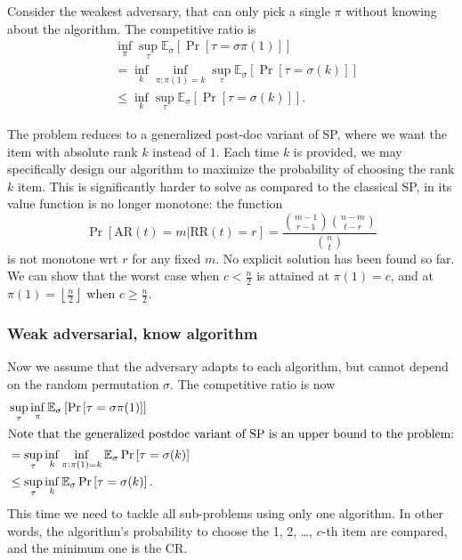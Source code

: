 Consider the weakest adversary, that can only pick a single $\pi$ without knowing about the algorithm. The competitive ratio is
\begin{align*}
	&\inf_\pi \sup_\tau \mathbb{E}_\sigma \left[ \operatorname{Pr}\left[{  \tau = \sigma\pi(1) }\right]   \right]\\
	&= \inf_k \inf_{\pi:\pi(1)=k}\sup_\tau \mathbb{E}_\sigma \left[ \operatorname{Pr}\left[{  \tau = \sigma(k) }\right]   \right]\\
	&\le  \inf_k \sup_\tau \mathbb{E}_\sigma \left[ \operatorname{Pr}\left[{  \tau = \sigma(k) }\right]   \right]
.\end{align*}

The problem reduces to a generalized post-doc variant of SP, where we want the item with absolute rank $k$ instead of $1$. Each time $k $ is provided, we may specifically design our algorithm to maximize the probability of choosing the rank $k $ item. This is significantly harder to solve as compared to the classical SP, in its value function is no longer monotone: the function \[
\operatorname{Pr}\left[{\text{AR}(t) = m | \text{RR}(t) = r }\right] = \frac{\binom{m-1}{r-1}\binom{n-m}{t-r}}{\binom{n}{t}}
\]
is not monotone wrt $r $ for any fixed $m $. No explicit solution has been found so far. We can show that the worst case when $c < \frac{n}{2}$ is attained at $\pi(1)=c $, and at $\pi(1) = \left\lfloor \frac{n}{2} \right\rfloor $ when $ c \ge  \frac{n}{2}$.

\subsubsection{Weak adversarial, know algorithm}

Now we assume that the adversary adapts to each algorithm, but cannot depend on the random permutation $\sigma$. The competitive ratio is now
\begin{align*}
	&\sup_\tau  \inf_\pi \mathbb{E}_\sigma \left[ \operatorname{Pr}\left[{ 
	\tau = \sigma\pi(1) }   \right] \right]\\
\intertext{Note that the generalized postdoc variant of SP is an upper bound to the problem:}
	&= \sup_\tau \inf_k \inf_{\pi:\pi(1)=k } \mathbb{E}_\sigma \operatorname{Pr}\left[{ \tau =\sigma(k) }\right]  \\
	&\le  \sup_\tau \inf_k \mathbb{E}_\sigma \operatorname{Pr}\left[{ \tau =\sigma(k) }\right]  
.\end{align*}
This time we need to tackle all sub-problems using only one algorithm. In other words, the algorithm's probability to choose the 1, 2, \ldots, $c $-th item are compared, and the minimum one is the CR.

